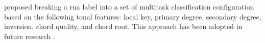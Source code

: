 
\textcite{chen2018functional} proposed breaking a \gls{rna}
label into a set of multitask classification configuration
based on the following tonal features: local key, primary
degree, secondary degree, inversion, chord quality, and
chord root. This approach has been adopted in future
research \parencite{chen2019harmony,
micchi2020not,micchi2021deep}.
